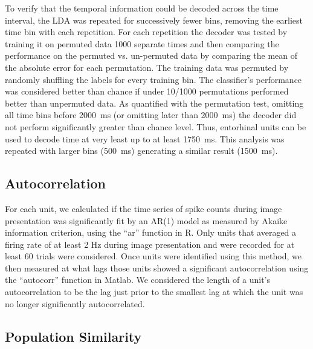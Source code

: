 \documentclass{apa}
\begin{document}
To verify that the temporal information could be decoded across the time
interval, the LDA was repeated for successively fewer bins, removing the
earliest time bin with each repetition.  For each repetition
the decoder was tested by training it on permuted data
1000 separate times and then comparing the performance on the permuted vs.
un-permuted data by comparing the mean of the absolute error for each
permutation.  The training data was permuted by randomly shuffling the labels for every training bin.  The classifier's performance was considered better than chance if under
10/1000 permutations performed better than unpermuted data. 
As quantified with the
permutation test, omitting all time bins before 2000~ms (or omitting later
than 2000~ms) the decoder did not perform significantly greater than chance
level.  Thus, entorhinal units can be used to decode time at very least up to at least 1750~ms.  This analysis was repeated with
larger bins (500~ms) generating a similar result (1500~ms).

\subsection{Autocorrelation}

For each unit, we calculated if the time series of spike counts during image presentation 
was significantly fit by an AR(1) model as measured by Akaike information criterion, using the
``ar'' function in R. Only units that averaged a firing rate of at least 2 Hz during image presentation 
and were recorded for at least 60 trials were considered.
Once units were identified using this method, we then measured at what lags
those units showed a significant autocorrelation using the ``autocorr'' function in Matlab. We
considered the length of a unit's autocorrelation to be the lag just prior to the smallest lag 
at which the unit was no longer significantly autocorrelated.

\subsection{Population Similarity}
\end{document}
